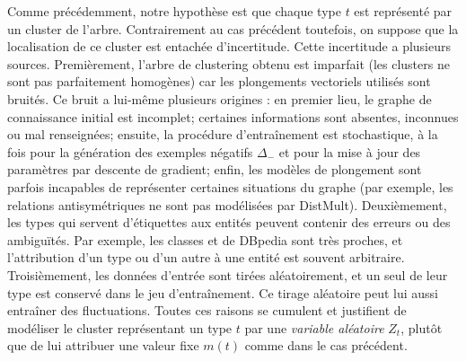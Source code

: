
Comme précédemment, notre hypothèse est que chaque type $t$ est représenté par un cluster de l'arbre. Contrairement au cas précédent toutefois, on suppose que la localisation de ce cluster est entachée d'incertitude. Cette incertitude a plusieurs sources. Premièrement, l'arbre de clustering obtenu est imparfait (les clusters ne sont pas parfaitement homogènes) car les plongements vectoriels utilisés sont bruités. Ce bruit a lui-même plusieurs origines : en premier lieu, le graphe de connaissance initial est incomplet; certaines informations sont absentes, inconnues ou mal renseignées; ensuite, la procédure d'entraînement est stochastique, à la fois pour la génération des exemples négatifs $\Delta_-$ et pour la mise à jour des paramètres par descente de gradient; enfin, les modèles de plongement sont parfois incapables de représenter certaines situations du graphe (par exemple, les relations antisymétriques ne sont pas modélisées par DistMult). Deuxièmement, les types qui servent d'étiquettes aux entités peuvent contenir des erreurs ou des ambiguïtés. Par exemple, les classes  et  de DBpedia sont très proches, et l'attribution d'un type ou d'un autre à une entité est souvent arbitraire. Troisièmement, les données d'entrée sont tirées aléatoirement, et un seul de leur type est conservé dans le jeu d'entraînement. Ce tirage aléatoire peut lui aussi entraîner des fluctuations. Toutes ces raisons se cumulent et justifient de modéliser le cluster représentant un type $t$ par une \textit{variable aléatoire} $Z_t$, plutôt que de lui attribuer une valeur fixe $m(t)$ comme dans le cas précédent.

